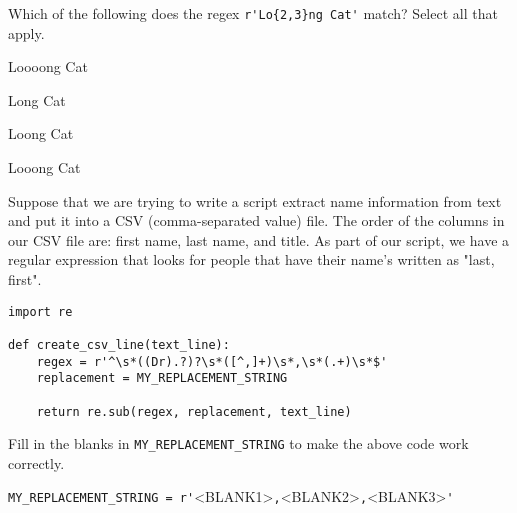 \documentclass[addpoints]{exam}
\begin{document}
\begin{questions}
\begin{minipage}{\textwidth}

\question[5]

Which of the following does the regex \verb|r'Lo{2,3}ng Cat'| match? Select all that apply.

\vspace{0.2cm}

\begin{choices}

\choice

Loooong Cat
\choice

Long Cat
\choice

Loong Cat
\choice

Looong Cat

\end{choices}

\end{minipage}





\vspace{1cm}

\begin{minipage}{\textwidth}

\question[10]

Suppose that we are trying to write a script extract name information from text and put it into a CSV (comma-separated value) file.
The order of the columns in our CSV file are: first name, last name, and title.
As part of our script, we have a regular expression that looks for people that have their name's written as "last, first".

\begin{lstlisting}
import re

def create_csv_line(text_line):
    regex = r'^\s*((Dr).?)?\s*([^,]+)\s*,\s*(.+)\s*$'
    replacement = MY_REPLACEMENT_STRING

    return re.sub(regex, replacement, text_line)
\end{lstlisting}

Fill in the blanks in \verb|MY_REPLACEMENT_STRING| to make the above code work correctly.

\verb|MY_REPLACEMENT_STRING = r'|\textsc{<BLANK1>}\verb|,|\textsc{<BLANK2>}\verb|,|\textsc{<BLANK3>}\verb|'|

\vspace{0.2cm}


\end{minipage}
\end{questions}
\end{document}
